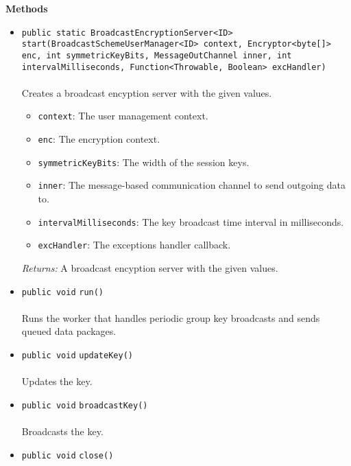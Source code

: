 \textbf{\sffamily Methods}
\begin{itemize}
\item \lstinline|public static BroadcastEncryptionServer<ID>| \lstinline|start|\lstinline|(BroadcastSchemeUserManager<ID> context, Encryptor<byte[]> enc, int symmetricKeyBits, MessageOutChannel inner, int intervalMilliseconds, Function<Throwable, Boolean> excHandler)|\\ \\[-0.6em]
Creates a broadcast encyption server with the given values.
\begin{itemize}
\item \lstinline|context|: The user management context.
\item \lstinline|enc|: The encryption context.
\item \lstinline|symmetricKeyBits|: The width of the session keys.
\item \lstinline|inner|: The message-based communication channel to send outgoing data to.
\item \lstinline|intervalMilliseconds|: The key broadcast time interval in milliseconds.
\item \lstinline|excHandler|: The exceptions handler callback.
\end{itemize}

\emph{Returns:} A broadcast encyption server with the given values.

\item \lstinline|public void| \lstinline|run|\lstinline|()|\\ \\[-0.6em]
Runs the worker that handles periodic group key broadcasts and sends
 queued data packages.



\item \lstinline|public void| \lstinline|updateKey|\lstinline|()|\\ \\[-0.6em]
Updates the key.



\item \lstinline|public void| \lstinline|broadcastKey|\lstinline|()|\\ \\[-0.6em]
Broadcasts the key.



\item \lstinline|public void| \lstinline|close|\lstinline|()| \\[-0.6em]





\end{itemize}
